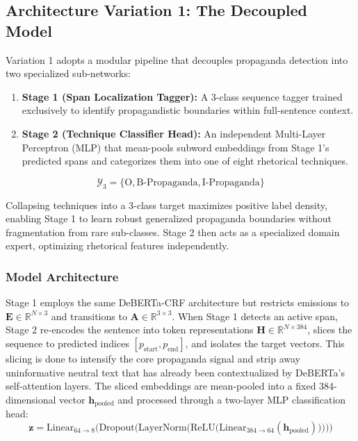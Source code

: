\documentclass[12pt, a4paper]{article}
\begin{document}
\subsection{Architecture Variation 1: The Decoupled Model}
\label{subsec:task2_variation1}

Variation 1 adopts a modular pipeline that decouples propaganda detection into two specialized sub-networks:
\begin{enumerate}[leftmargin=*, noitemsep]
    \item \textbf{Stage 1 (Span Localization Tagger):} A 3-class sequence tagger trained exclusively to identify propagandistic boundaries within full-sentence context.
    \item \textbf{Stage 2 (Technique Classifier Head):} An independent Multi-Layer Perceptron (MLP) that mean-pools subword embeddings from Stage 1's predicted spans and categorizes them into one of eight rhetorical techniques.
\end{enumerate}
\[
\mathcal{Y}_3 = \{\text{O}, \text{B-Propaganda}, \text{I-Propaganda}\}
\]

Collapsing techniques into a 3-class target maximizes positive label density, enabling Stage 1 to learn robust generalized propaganda boundaries without fragmentation from rare sub-classes. Stage 2 then acts as a specialized domain expert, optimizing rhetorical features independently.

\subsubsection{Model Architecture}
\label{subsubsec:task2_var1_architecture}

Stage 1 employs the same DeBERTa-CRF architecture but restricts emissions to $\mathbf{E} \in \mathbb{R}^{N \times 3}$ and transitions to $\mathbf{A} \in \mathbb{R}^{3 \times 3}$. When Stage 1 detects an active span, Stage 2 re-encodes the sentence into token representations $\mathbf{H} \in \mathbb{R}^{N \times 384}$, slices the sequence to predicted indices $[p_{\text{start}}, p_{\text{end}}]$, and isolates the target vectors. This slicing is done to intensify the core propaganda signal and strip away uninformative neutral text that has already been contextualized by DeBERTa's self-attention layers. The sliced embeddings are mean-pooled into a fixed 384-dimensional vector $\mathbf{h}_{\text{pooled}}$ and processed through a two-layer MLP classification head:
\[
\mathbf{z} = \text{Linear}_{64 \rightarrow 8}\Big(\text{Dropout}\Big(\text{LayerNorm}\Big(\text{ReLU}\Big(\text{Linear}_{384 \rightarrow 64}(\mathbf{h}_{\text{pooled}})\Big)\Big)\Big)\Big)
\]
\end{document}
